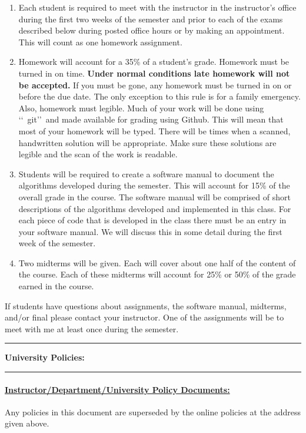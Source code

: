 \documentclass[10pt,fleqn]{article}
\begin{document}
\begin{enumerate}
\item Each student is required to meet with the instructor in the instructor's
      office during the first two weeks of the semester and prior to each of the
      exams described below during posted office hours or by making an
      appointment. This will count as one homework assignment.
\item Homework will account for a 35\% of a student's grade. Homework must be
      turned in on time. {\bf Under normal conditions late homework will not be
      accepted.} If you must be gone, any homework must be turned in on or
      before the due date. The only exception to this rule is for a family
      emergency. Also, homework must legible. Much of your work will be done
      using \lq\lq\ git\rq\rq\ and made available for grading using Github. This
      will mean that most of your homework will be typed. There will be times
      when a scanned, handwritten solution will be appropriate. Make sure these
      solutions are legible and the scan of the work is readable.
\item Students will be required to create a software manual to document the
      algorithms developed during the semester. This will account for 15\% of
      the overall grade in the course. The software manual will be comprised of
      short descriptions of the algorithms developed and implemented in this
      class. For each piece of code that is developed in the class there must be
      an entry in your software manual. We will discuss this in some detail
      during the first week of the semester.
\item Two midterms will be given. Each will cover about one half of the content
      of the course. Each of these midterms will account for 25\% or 50\% of the
      grade earned in the course.
\end{enumerate}
If students have questions about assignments, the software manual, midterms, 
and/or final please contact your instructor. One of the assignments will be to
meet with me at least once during the semester. 
\vskip0.1in\hrule\vskip0.1in
\noindent
{\bf University Policies:}
\vskip0.1in\hrule\vskip0.1in
\paragraph{\underline{Instructor/Department/University Policy Documents:}}
Any policies in this document are superseded by the online policies at the
address given above.
\end{document}
